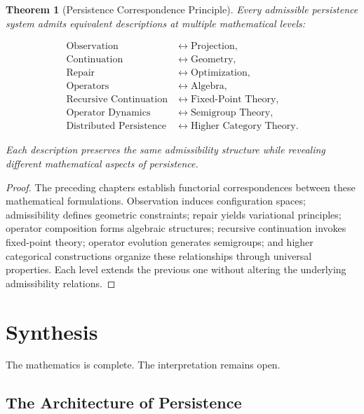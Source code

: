 \documentclass[11pt]{book}
\numberwithin{equation}{chapter}
\theoremstyle{definition}
\theoremstyle{plain}
\newtheorem{theorem}[definition]{Theorem}
\begin{document}
\begin{theorem}[Persistence Correspondence Principle]

Every admissible persistence system admits equivalent descriptions at
multiple mathematical levels:

\[
\begin{aligned}
\text{Observation}
&\longleftrightarrow
\text{Projection},
\\
\text{Continuation}
&\longleftrightarrow
\text{Geometry},
\\
\text{Repair}
&\longleftrightarrow
\text{Optimization},
\\
\text{Operators}
&\longleftrightarrow
\text{Algebra},
\\
\text{Recursive Continuation}
&\longleftrightarrow
\text{Fixed-Point Theory},
\\
\text{Operator Dynamics}
&\longleftrightarrow
\text{Semigroup Theory},
\\
\text{Distributed Persistence}
&\longleftrightarrow
\text{Higher Category Theory}.
\end{aligned}
\]

Each description preserves the same admissibility structure while
revealing different mathematical aspects of persistence.

\end{theorem}

\begin{proof}

The preceding chapters establish functorial correspondences between
these mathematical formulations. Observation induces configuration
spaces; admissibility defines geometric constraints; repair yields
variational principles; operator composition forms algebraic
structures; recursive continuation invokes fixed-point theory; operator
evolution generates semigroups; and higher categorical constructions
organize these relationships through universal properties. Each level
extends the previous one without altering the underlying admissibility
relations.

\end{proof}

\chapter{Synthesis}

\epigraph{%
The mathematics is complete.
The interpretation remains open.
}{}

\section{The Architecture of Persistence}
\end{document}
